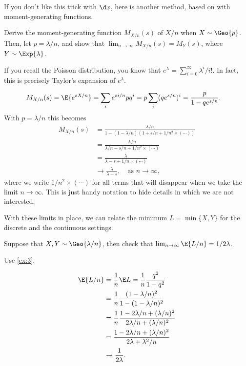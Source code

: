 \documentclass[a4paper]{article}
\begin{document}
If you don't like this trick with \(\d x\), here is another method, based on with moment-generating functions.

\begin{exercise}
Derive the moment-generating function \(M_{X/n}(s)\) of \(X/n\) when \(X\sim \Geo{p}\).
Then, let \(p = \lambda/n\), and show that \(\lim_{n\to\infty}M_{X/n}(s) = M_{Y}(s)\), where \(Y \sim \Exp{\lambda}\).
\begin{hint}
If you recall the Poisson distribution, you know that \(e^{\lambda} = \sum_{i=0}^{\infty}\lambda^{i}/i!\).
In fact, this is precisely Taylor's expansion of \(e^{\lambda}\).
\end{hint}
\begin{solution}
  \begin{align*}
M_{X/n}(s)
&= \E{e^{s X/n}} = \sum_{i} e^{s i/n} p q^{i} = p\sum_{i} (qe^{s/n})^{i} = \frac{p}{1-qe^{s/n}}.
  \end{align*}
With \(p=\lambda/n\) this becomes
  \begin{align*}
M_{X/n}(s)
&= \frac{\lambda/n}{1-(1-\lambda/n) (1+s/n + 1/n^{2}\times(\cdots))} \\
&= \frac{\lambda/n}{\lambda/n - s/n + 1/n^{2}\times (\cdots)} \\
&= \frac{\lambda}{\lambda - s + 1/n\times(\cdots)} \\
&\to \frac{\lambda}{\lambda - s}, \quad\text{as }  n\to \infty,
  \end{align*}
where we write \(1/n^{2}\times(\cdots)\) for all terms that will disappear when we take the limit \(n\to \infty\).
This is just handy notation to hide details in which we are not interested.
\end{solution}
\end{exercise}

With these limits in place, we can relate the minimum \(L=\min\{X, Y\}\) for the discrete and the continuous settings.

\begin{exercise}
Suppose that \(X, Y\sim \Geo{\lambda/n}\), then check that \(\lim_{n\to\infty}\E{L/n} = 1/2\lambda\).
\begin{hint}
Use \cref{ex:3}.
\end{hint}
\begin{solution}
  \begin{align*}
\E{L/n}  &= \frac 1 n \E L = \frac 1 n \frac{q^2}{1-q^{2}} \\
 &= \frac 1 n \frac{(1-\lambda/n)^2}{1-(1-\lambda/n)^{2}} \\
 &= \frac 1 n \frac{1-2 \lambda/n + (\lambda/n)^2}{2 \lambda /n + (\lambda/n)^{2}} \\
 &= \frac{1-2 \lambda/n + (\lambda/n)^2}{2 \lambda + \lambda^{2}/n} \\
&\to \frac 1{2\lambda}.
  \end{align*}
\end{solution}
\end{exercise}
\end{document}
